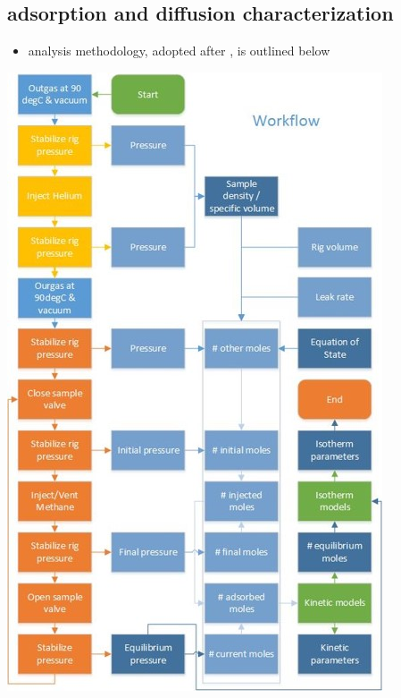 \documentclass[11pt]{article}
\begin{document}
\subsection{adsorption and diffusion characterization}
\label{sec:orgb1abb43}
\begin{itemize}
\item analysis methodology, adopted after \cite{rouquerol1994}, is outlined below
\end{itemize}
\begin{center}
\includegraphics[width=.9\linewidth]{./adsorption_workflow.jpg}
\end{center}
\end{document}
